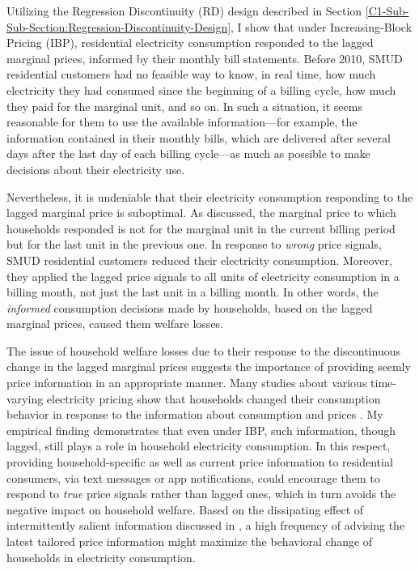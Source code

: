 Utilizing the Regression Discontinuity (RD) design described in Section \ref{C1-Sub-Sub-Section:Regression-Discontinuity-Design}, I show that under Increasing-Block Pricing (IBP), residential electricity consumption responded to the lagged marginal prices, informed by their monthly bill statements. Before 2010, SMUD residential customers had no feasible way to know, in real time, how much electricity they had consumed since the beginning of a billing cycle, how much they paid for the marginal unit, and so on. In such a situation, it seems reasonable for them to use the available information---for example, the information contained in their monthly bills, which are delivered after several days after the last day of each billing cycle---as much as possible to make decisions about their electricity use. 

Nevertheless, it is undeniable that their electricity consumption responding to the lagged marginal price is suboptimal. As discussed, the marginal price to which households responded is not for the marginal unit in the current billing period but for the last unit in the previous one. In response to \textit{wrong} price signals, SMUD residential customers reduced their electricity consumption. Moreover, they applied the lagged price signals to all units of electricity consumption in a billing month, not just the last unit in a billing month. In other words, the \textit{informed} consumption decisions made by households, based on the lagged marginal prices, caused them welfare losses. 

The issue of household welfare losses due to their response to the discontinuous change in the lagged marginal prices suggests the importance of providing seemly price information in an appropriate manner. Many studies about various time-varying electricity pricing show that households changed their consumption behavior in response to the information about consumption and prices \citep{Dynamic-Pricing-of-Electricity-in-the-Mid-Atlantic-Region_Econometric-Results-from-the-Baltimore-Gas-and-Electric-Company-Experiment_Faruqui-et-al_2011, Knowledge-is-Less-Power_Jessoe-and-Rapson_2014, The-Effect-of-Information-on-TOU-Electricity-Use:An-Irish-Residential-Study_Pon_2017, Information-vs-Automation-and-Implications-for-Dynamic-Pricing_Bollinger-and-Hartmann_2020}. My empirical finding demonstrates that even under IBP, such information, though lagged, still plays a role in household electricity consumption. In this respect, providing household-specific as well as current price information to residential consumers, via text messages or app notifications, could encourage them to respond to \textit{true} price signals rather than lagged ones, which in turn avoids the negative impact on household welfare. Based on the dissipating effect of intermittently salient information discussed in \cite{Dynamic-Salience-with-Intermittent-Billing_Gilbert-and-Zivin_2014}, a high frequency of advising the latest tailored price information might maximize the behavioral change of households in electricity consumption.

